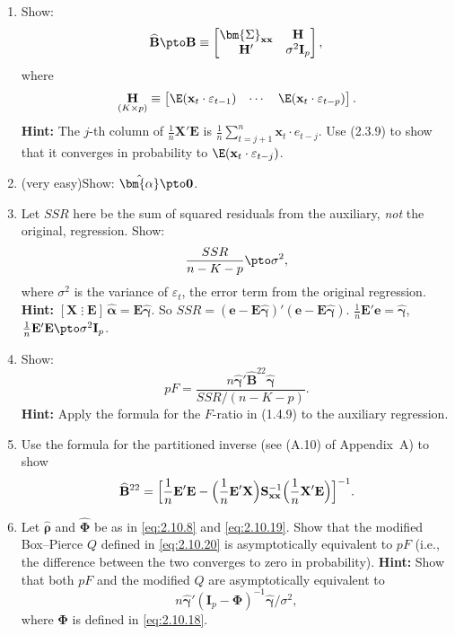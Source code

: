 \begin{problemset}
\begin{enumerate}[label=(\alph*)]
\item Show:
\[
\widehat{\mathbf{B}} \pto \mathbf{B}
\equiv \begin{bmatrix}
\bm{\Sigma}_{\mathbf{xx}} & \mathbf{H} \\
\mathbf{H}' & \sigma^2\mathbf{I}_p
\end{bmatrix},
\]
where
\[
\underset{(K\times p)}{\mathbf{H}}
\equiv \begin{bmatrix}
\E(\mathbf{x}_t\cdot\varepsilon_{t-1}) & \cdots &
\E(\mathbf{x}_t\cdot\varepsilon_{t-p})
\end{bmatrix}.
\]
\textbf{Hint:} The $j$-th column of $\frac{1}{n}\mathbf{X}'\mathbf{E}$ is
$\frac{1}{n}\sum_{t=j+1}^{n}\mathbf{x}_t\cdot e_{t-j}$. Use (2.3.9) to show
that it converges in probability to $\E(\mathbf{x}_t\cdot\varepsilon_{t-j})$.

\item (very easy)\quad Show: $\hat{\bm{\alpha}} \pto \mathbf{0}$.

\item Let $SSR$ here be the sum of squared residuals from the auxiliary, \emph{not} the
original, regression. Show:
\[
\frac{SSR}{n - K - p} \pto \sigma^2,
\]
where $\sigma^2$ is the variance of $\varepsilon_t$, the error term from the original regression.
\textbf{Hint:}
$[\mathbf{X} \;\vdots\; \mathbf{E}]\,\hat{\bm{\alpha}} = \mathbf{E}\hat{\bm{\gamma}}$.
So $SSR = (\mathbf{e} - \mathbf{E}\hat{\bm{\gamma}})'(\mathbf{e} - \mathbf{E}\hat{\bm{\gamma}})$.
$\frac{1}{n}\mathbf{E}'\mathbf{e} = \hat{\bm{\gamma}}$,
$\frac{1}{n}\mathbf{E}'\mathbf{E} \pto \sigma^2\mathbf{I}_p$.

\item Show:
\[
pF = \frac{n\hat{\bm{\gamma}}'\widehat{\mathbf{B}}^{22}\hat{\bm{\gamma}}}
{SSR/(n - K - p)}.
\]
\textbf{Hint:} Apply the formula for the $F$-ratio in (1.4.9) to the auxiliary regression.

\item Use the formula for the partitioned inverse (see (A.10) of Appendix~A) to
show
\[
\widehat{\mathbf{B}}^{22} = \Bigl[\frac{1}{n}\mathbf{E}'\mathbf{E}
- \Bigl(\frac{1}{n}\mathbf{E}'\mathbf{X}\Bigr)\mathbf{S}_{\mathbf{xx}}^{-1}
\Bigl(\frac{1}{n}\mathbf{X}'\mathbf{E}\Bigr)\Bigr]^{-1}.
\]

\item Let $\hat{\bm{\rho}}$ and $\widehat{\mathbf{\Phi}}$ be as in \eqref{eq:2.10.8}
and \eqref{eq:2.10.19}. Show that the modified Box--Pierce $Q$ defined in \eqref{eq:2.10.20}
is asymptotically equivalent to $pF$ (i.e., the
difference between the two converges to zero in probability).
\textbf{Hint:} Show that both $pF$ and the modified $Q$ are asymptotically equivalent to
\[
n\hat{\bm{\gamma}}'(\mathbf{I}_p - \mathbf{\Phi})^{-1}\hat{\bm{\gamma}}/\sigma^2,
\]
where $\mathbf{\Phi}$ is defined in \eqref{eq:2.10.18}.
\end{enumerate}


\end{problemset}
